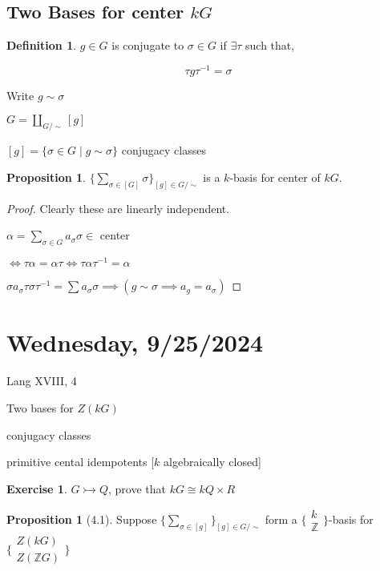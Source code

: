 \documentclass{article}
\theoremstyle{definition}
\newtheorem*{exercise}{Exercise}
\newtheorem*{definition}{Definition}
\newtheorem{proposition}[theorem]{Proposition}
\begin{document}
\subsection*{Two Bases for center \(kG\)}

\begin{definition}
    \(g\in G\) is conjugate to \(\sigma \in G\) if \(\exists \tau\) such that,
    
    \[
        \tau g \tau ^{-1} = \sigma
    \]

    Write \(g \sim \sigma\) 
\end{definition}

\(G = \coprod_{G / \sim}[g]\) 

\([g]= \{ \sigma \in G \mid g \sim \sigma \} \) conjugacy classes 

\begin{proposition}
    \(\{ \sum_{\sigma \in [G]} \sigma \}_{[g]\in G / \sim} \) is a \(k\)-basis for center of \(kG\). 
\end{proposition}

\begin{proof}
    Clearly these are linearly independent.

    \(\alpha = \sum_{\sigma \in G} a_\sigma \sigma \in\) center

    \(\iff \tau \alpha = \alpha \tau \iff \tau \alpha \tau ^{-1} = \alpha\) 

    \(\sigma a_\sigma \tau \sigma \tau ^{-1} = \sum  a_\sigma \sigma \implies (g \sim \sigma \implies a_g = a_\sigma)\) 
\end{proof}


\section*{Wednesday, 9/25/2024}

Lang XVIII, 4

Two bases for \(Z(kG)\)

conjugacy classes

primitive cental idempotents [\(k\) algebraically closed]

\begin{exercise}
    \(G \rightarrowtail Q\), prove that \(kG \cong kQ \times R\) 
\end{exercise}

\begin{proposition}
    [4.1] Suppose \(\{ \sum_{\sigma \in [g]}  \}_{[g] \in G / \sim} \) form a \(\{ \substack{k \\ \mathbb{Z}} \} \)-basis for \(\{ \substack{Z(kG) \\ Z(\mathbb{Z} G)} \} \)  
\end{proposition}
\end{document}
